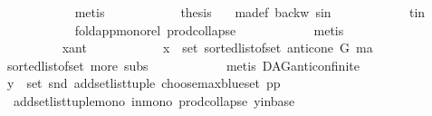 \begin{isabellebody}
\ \ \ \ \ \ \ \ \ \ \isamarkupfalse%
\ metis\isanewline
\ \ \ \ \ \ \ \ \isamarkupfalse%
\ \isamarkupfalse%
\ {\isacharquery}{\kern0pt}thesis\ \isamarkupfalse%
\ \ ma{\isacharunderscore}{\kern0pt}def\ backw\ s{\isacharunderscore}{\kern0pt}in\isanewline
\ \ \ \ \ \ \ \ \ \ \isamarkupfalse%
\ t{\isacharunderscore}{\kern0pt}in\ \isanewline
\ \ \ \ \ \ \ \ \ \ \isamarkupfalse%
\ fold{\isacharunderscore}{\kern0pt}app{\isacharunderscore}{\kern0pt}mono{\isacharunderscore}{\kern0pt}rel\ prod{\isachardot}{\kern0pt}collapse\isanewline
\ \ \ \ \ \ \ \ \ \ \isamarkupfalse%
\ metis\ \ \ \ \ \isanewline
\ \ \ \ \ \ \isamarkupfalse%
\isanewline
\ \ \ \ \ \ \ \ \isamarkupfalse%
\ x{\isacharunderscore}{\kern0pt}ant\isanewline
\ \ \ \ \ \ \ \ \isamarkupfalse%
\ \isamarkupfalse%
\ {\isachardoublequoteopen}x\ {\isasymin}\ set\ {\isacharparenleft}{\kern0pt}sorted{\isacharunderscore}{\kern0pt}list{\isacharunderscore}{\kern0pt}of{\isacharunderscore}{\kern0pt}set\ {\isacharparenleft}{\kern0pt}anticone\ G\ ma{\isacharparenright}{\kern0pt}{\isacharparenright}{\kern0pt}{\isachardoublequoteclose}\ \isanewline
\ \ \ \ \ \ \ \ \ \ \isamarkupfalse%
\ sorted{\isacharunderscore}{\kern0pt}list{\isacharunderscore}{\kern0pt}of{\isacharunderscore}{\kern0pt}set{\isacharparenleft}{\kern0pt}{}{\isacharparenright}{\kern0pt}\ more\ subs\isanewline
\ \ \ \ \ \ \ \ \ \ \isamarkupfalse%
\ {\isacharparenleft}{\kern0pt}metis\ DAG{\isachardot}{\kern0pt}anticon{\isacharunderscore}{\kern0pt}finite{\isacharparenright}{\kern0pt}\ \isanewline
\ \ \ \ \ \ \ \ \isamarkupfalse%
\ \isamarkupfalse%
\ {\isachardoublequoteopen}y\ {\isasymin}\ set\ {\isacharparenleft}{\kern0pt}snd\ {\isacharparenleft}{\kern0pt}add{\isacharunderscore}{\kern0pt}set{\isacharunderscore}{\kern0pt}list{\isacharunderscore}{\kern0pt}tuple\ {\isacharparenleft}{\kern0pt}choose{\isacharunderscore}{\kern0pt}max{\isacharunderscore}{\kern0pt}blue{\isacharunderscore}{\kern0pt}set\ pp{\isacharparenright}{\kern0pt}{\isacharparenright}{\kern0pt}{\isacharparenright}{\kern0pt}{\isachardoublequoteclose}\isanewline
\ \ \ \ \ \ \ \ \ \ \isamarkupfalse%
\ \ add{\isacharunderscore}{\kern0pt}set{\isacharunderscore}{\kern0pt}list{\isacharunderscore}{\kern0pt}tuple{\isacharunderscore}{\kern0pt}mono\ in{\isacharunderscore}{\kern0pt}mono\ prod{\isachardot}{\kern0pt}collapse\ y{\isacharunderscore}{\kern0pt}in{\isacharunderscore}{\kern0pt}base\isanewline

\end{isabellebody}
